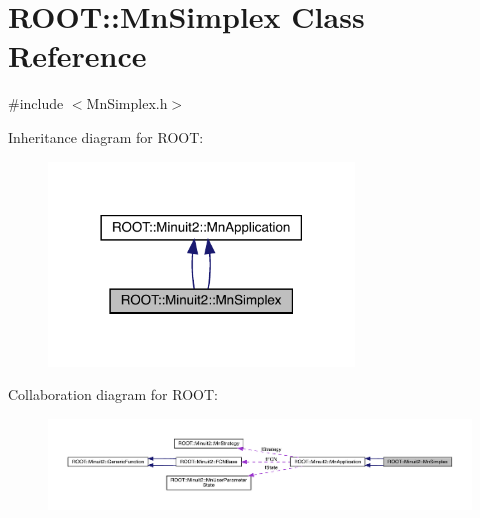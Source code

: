\hypertarget{classROOT_1_1Minuit2_1_1MnSimplex}{}\section{R\+O\+OT\+:\+:Mn\+Simplex Class Reference}
\label{classROOT_1_1Minuit2_1_1MnSimplex}


{\ttfamily \#include $<$Mn\+Simplex.\+h$>$}



Inheritance diagram for R\+O\+OT\+:\nopagebreak
\begin{figure}[H]
\begin{center}
\leavevmode
\includegraphics[width=230pt]{d6/d60/classROOT_1_1Minuit2_1_1MnSimplex__inherit__graph}
\end{center}
\end{figure}


Collaboration diagram for R\+O\+OT\+:\nopagebreak
\begin{figure}[H]
\begin{center}
\leavevmode
\includegraphics[width=350pt]{d3/d9c/classROOT_1_1Minuit2_1_1MnSimplex__coll__graph}
\end{center}
\end{figure}
